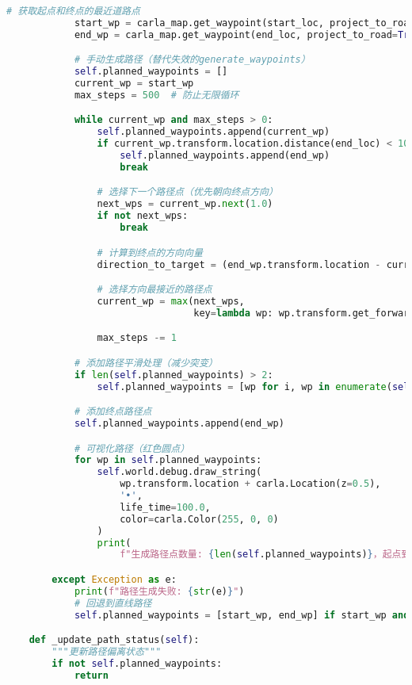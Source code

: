\begin{lstlisting}[language=Python]
            # 获取起点和终点的最近道路点
            start_wp = carla_map.get_waypoint(start_loc, project_to_road=True)
            end_wp = carla_map.get_waypoint(end_loc, project_to_road=True)

            # 手动生成路径（替代失效的generate_waypoints）
            self.planned_waypoints = []
            current_wp = start_wp
            max_steps = 500  # 防止无限循环

            while current_wp and max_steps > 0:
                self.planned_waypoints.append(current_wp)
                if current_wp.transform.location.distance(end_loc) < 10.0:
                    self.planned_waypoints.append(end_wp)
                    break

                # 选择下一个路径点（优先朝向终点方向）
                next_wps = current_wp.next(1.0)
                if not next_wps:
                    break

                # 计算到终点的方向向量
                direction_to_target = (end_wp.transform.location - current_wp.transform.location).make_unit_vector()

                # 选择方向最接近的路径点
                current_wp = max(next_wps,
                                 key=lambda wp: wp.transform.get_forward_vector().dot(direction_to_target))

                max_steps -= 1

            # 添加路径平滑处理（减少突变）
            if len(self.planned_waypoints) > 2:
                self.planned_waypoints = [wp for i, wp in enumerate(self.planned_waypoints) if i % 2 == 0]

            # 添加终点路径点
            self.planned_waypoints.append(end_wp)

            # 可视化路径（红色圆点）
            for wp in self.planned_waypoints:
                self.world.debug.draw_string(
                    wp.transform.location + carla.Location(z=0.5),
                    '•',
                    life_time=100.0,
                    color=carla.Color(255, 0, 0)
                )
                print(
                    f"生成路径点数量: {len(self.planned_waypoints)}，起点到终点距离: {start_loc.distance(end_loc):.1f}m")

        except Exception as e:
            print(f"路径生成失败: {str(e)}")
            # 回退到直线路径
            self.planned_waypoints = [start_wp, end_wp] if start_wp and end_wp else []

    def _update_path_status(self):
        """更新路径偏离状态"""
        if not self.planned_waypoints:
            return


\end{lstlisting}
